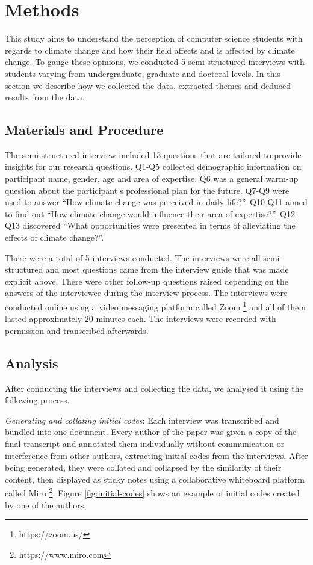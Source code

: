 

\section{Methods}

This study aims to understand the perception of computer science students with regards to climate change and how their field affects and is affected by climate change. To gauge these opinions, we conducted 5 semi-structured interviews with students varying from undergraduate, graduate and doctoral levels. In this section we describe how we collected the data, extracted themes and deduced results from the data.

\subsection{Materials and Procedure}
The semi-structured interview included 13 questions that are tailored to provide insights for our research questions. Q1-Q5 collected demographic information on participant name, gender, age and area of expertise. Q6 was a general warm-up question about the participant’s professional plan for the future. Q7-Q9 were used to answer “How climate change was perceived in daily life?”. Q10-Q11 aimed to find out “How climate change would influence their area of expertise?”. Q12-Q13 discovered “What opportunities were presented in terms of alleviating the effects of climate change?”. 

There were a total of 5 interviews conducted. The interviews were all semi-structured and most questions came from the interview guide that was made explicit above. There were other follow-up questions raised depending on the answers of the interviewee during the interview process. The interviews were conducted online using a video messaging platform called Zoom \footnote{https://zoom.us/} and all of them lasted approximately 20 minutes each. The interviews were recorded with permission and transcribed afterwards. 
\subsection{Analysis}
After conducting the interviews and collecting the data, we analysed it using the following process.

\emph{Generating and collating initial codes}: Each interview was transcribed and bundled into one document. Every author of the paper was given a copy of the final transcript and annotated them individually without communication or interference from other authors, extracting initial codes from the interviews. After being generated, they were collated and collapsed by the similarity of their content, then displayed as sticky notes using a collaborative whiteboard platform called Miro \footnote{https://www.miro.com}. Figure \ref{fig:initial-codes} shows an example of initial codes created by one of the authors.

